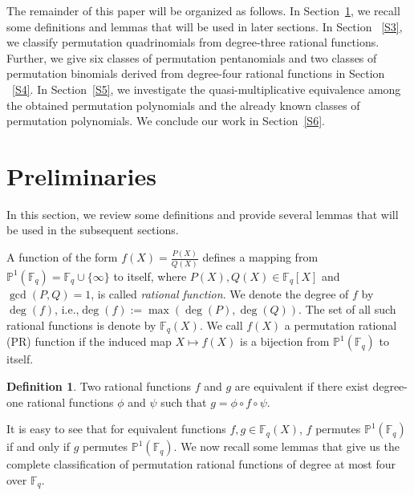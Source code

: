\documentclass[12pt]{amsart}
\numberwithin{equation}{section}
\theoremstyle{definition}
\newtheorem{defn}[thm]{Definition}
\newcommand{\F}{\mathbb F}
\newcommand{\bP}{\mathbb P}
\begin{document}
The remainder of this paper will be organized as follows. In Section~\ref{S2}, we recall some definitions and lemmas that will be used in later sections. In Section ~\ref{S3}, we classify permutation quadrinomials from degree-three rational functions. Further, we give six classes of permutation pentanomials and two classes of permutation binomials derived from degree-four rational functions in Section ~\ref{S4}. In Section~\ref{S5}, we 
investigate the quasi-multiplicative equivalence among the obtained permutation polynomials and the already known classes of permutation polynomials. We conclude our work in Section~\ref{S6}.

\section{Preliminaries}\label{S2}
In this section, we review some definitions and provide several lemmas that will be used in the subsequent sections. 

A function of the form $f(X)=\frac{P(X)}{Q(X)} $ defines a mapping from $\bP^1(\F_q)=\F_q\cup\{\infty\}$ to itself, where $P(X), Q(X) \in \F_q[X]$ and $\gcd(P,Q)=1$, is called \textit{rational function}. We denote the degree of $f$ by $\deg(f)$, i.e.,$\deg(f):=\max(\deg(P), \deg(Q))$. The set of all such rational functions is denote by $\F_q(X)$. We call $f(X)$ a permutation rational (PR) function if the induced map $X \mapsto f(X)$ is a bijection from $\bP^1(\F_q)$ to itself.
\begin{defn}\cite{Ding2020}
Two rational functions $f$ and $g$ are equivalent if there exist degree-one rational functions $\phi$ and $\psi$ such that $g= \phi \circ f \circ \psi$.
\end{defn}
 It is easy to see that for equivalent functions $f,g\in \F_q(X)$, $f$ permutes $\bP^1(\F_q)$ if and only if $g$ permutes  $\bP^1(\F_q)$.
We now recall some lemmas that give us the complete classification of permutation rational functions of degree at most four over $\F_q$.
\end{document}
